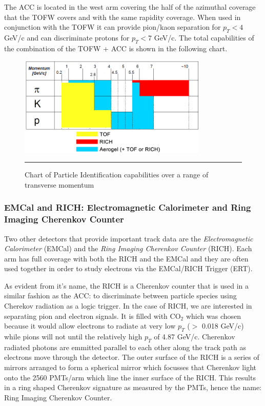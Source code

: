 The ACC is located in the west arm covering the half of the azimuthal coverage that the TOFW covers and with the same rapidity coverage. When used in conjunction with the TOFW it can provide pion/kaon separation for $p_{T} < 4$ GeV/c and can discriminate protons for $p_{T} < 7$ GeV/c.  The total capabilities of the combination of the TOFW + ACC is shown in the following chart.

\begin{figure}[h!]
  \centering
    \includegraphics[width=0.8\textwidth]{Figures/accrange.jpg}
    \rule{35em}{0.5pt}
  \caption[Chart of Particle Identification capabilities over a range of transverse momentum]{Chart of Particle Identification capabilities over a range of transverse momentum}
  \label{fig:PIDrange}
\end{figure}

\subsubsection{EMCal and RICH: Electromagnetic Calorimeter and Ring Imaging Cherenkov Counter}
Two other detectors that provide important track data are the \textit{Electromagnetic Calorimeter} (EMCal) and the \textit{Ring Imaging Cherenkov Counter} (RICH). Each arm has full coverage with both the RICH and the EMCal and they are often used together in order to study electrons via the EMCal/RICH Trigger (ERT).

As evident from it's name, the RICH is a Cherenkov counter that is used in a similar fashion as the ACC: to discriminate between particle species using Cherekov radiation as a logic trigger. In the case of RICH, we are interested in separating pion and electron signals. It is filled with CO$_2$ which was chosen because it would allow electrons to radiate at very low $p_T$ ($>$ 0.018 GeV/c) while pions will not until the relatively high $p_T$ of 4.87 GeV/c. Cherenkov radiated photons are emmitted parallel to each other along the track path as electrons move through the detector. The outer surface of the RICH is a series of mirrors arranged to form a spherical mirror which focusses that Cherenkov light onto the 2560 PMTs/arm which line the inner surface of the RICH. This results in a ring shaped Cherenkov signature as measured by the PMTs, hence the name: Ring Imaging Cherenkov Counter. 

